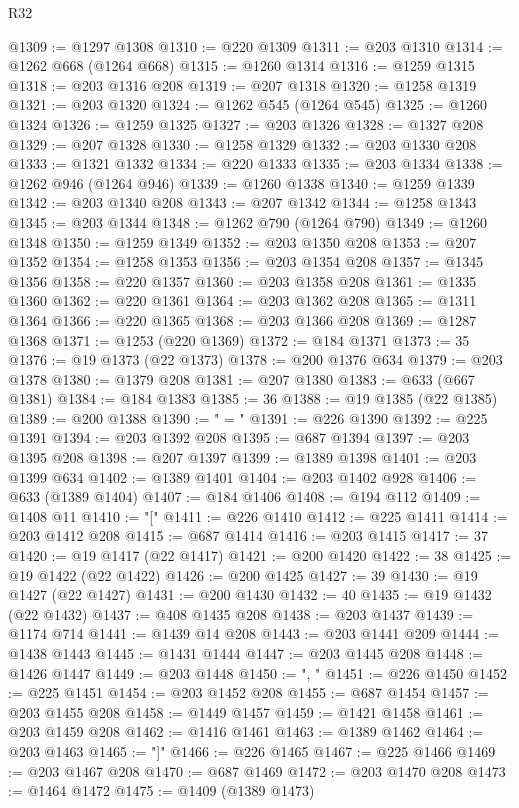 \begin{lexlean}{R32}
\begin{coremodule}
@1309 := @1297 @1308
@1310 := @220 @1309
@1311 := @203 @1310
@1314 := @1262 @668 (@1264 @668)
@1315 := @1260 @1314
@1316 := @1259 @1315
@1318 := @203 @1316 @208
@1319 := @207 @1318
@1320 := @1258 @1319
@1321 := @203 @1320
@1324 := @1262 @545 (@1264 @545)
@1325 := @1260 @1324
@1326 := @1259 @1325
@1327 := @203 @1326
@1328 := @1327 @208
@1329 := @207 @1328
@1330 := @1258 @1329
@1332 := @203 @1330 @208
@1333 := @1321 @1332
@1334 := @220 @1333
@1335 := @203 @1334
@1338 := @1262 @946 (@1264 @946)
@1339 := @1260 @1338
@1340 := @1259 @1339
@1342 := @203 @1340 @208
@1343 := @207 @1342
@1344 := @1258 @1343
@1345 := @203 @1344
@1348 := @1262 @790 (@1264 @790)
@1349 := @1260 @1348
@1350 := @1259 @1349
@1352 := @203 @1350 @208
@1353 := @207 @1352
@1354 := @1258 @1353
@1356 := @203 @1354 @208
@1357 := @1345 @1356
@1358 := @220 @1357
@1360 := @203 @1358 @208
@1361 := @1335 @1360
@1362 := @220 @1361
@1364 := @203 @1362 @208
@1365 := @1311 @1364
@1366 := @220 @1365
@1368 := @203 @1366 @208
@1369 := @1287 @1368
@1371 := @1253 (@220 @1369)
@1372 := @184 @1371
@1373 := 35
@1376 := @19 @1373 (@22 @1373)
@1378 := @200 @1376 @634
@1379 := @203 @1378
@1380 := @1379 @208
@1381 := @207 @1380
@1383 := @633 (@667 @1381)
@1384 := @184 @1383
@1385 := 36
@1388 := @19 @1385 (@22 @1385)
@1389 := @200 @1388
@1390 := " = "
@1391 := @226 @1390
@1392 := @225 @1391
@1394 := @203 @1392 @208
@1395 := @687 @1394
@1397 := @203 @1395 @208
@1398 := @207 @1397
@1399 := @1389 @1398
@1401 := @203 @1399 @634
@1402 := @1389 @1401
@1404 := @203 @1402 @928
@1406 := @633 (@1389 @1404)
@1407 := @184 @1406
@1408 := @194 @112
@1409 := @1408 @11
@1410 := "["
@1411 := @226 @1410
@1412 := @225 @1411
@1414 := @203 @1412 @208
@1415 := @687 @1414
@1416 := @203 @1415
@1417 := 37
@1420 := @19 @1417 (@22 @1417)
@1421 := @200 @1420
@1422 := 38
@1425 := @19 @1422 (@22 @1422)
@1426 := @200 @1425
@1427 := 39
@1430 := @19 @1427 (@22 @1427)
@1431 := @200 @1430
@1432 := 40
@1435 := @19 @1432 (@22 @1432)
@1437 := @408 @1435 @208
@1438 := @203 @1437
@1439 := @1174 @714
@1441 := @1439 @14 @208
@1443 := @203 @1441 @209
@1444 := @1438 @1443
@1445 := @1431 @1444
@1447 := @203 @1445 @208
@1448 := @1426 @1447
@1449 := @203 @1448
@1450 := ", "
@1451 := @226 @1450
@1452 := @225 @1451
@1454 := @203 @1452 @208
@1455 := @687 @1454
@1457 := @203 @1455 @208
@1458 := @1449 @1457
@1459 := @1421 @1458
@1461 := @203 @1459 @208
@1462 := @1416 @1461
@1463 := @1389 @1462
@1464 := @203 @1463
@1465 := "]"
@1466 := @226 @1465
@1467 := @225 @1466
@1469 := @203 @1467 @208
@1470 := @687 @1469
@1472 := @203 @1470 @208
@1473 := @1464 @1472
@1475 := @1409 (@1389 @1473)

\end{coremodule}
\end{lexlean}
